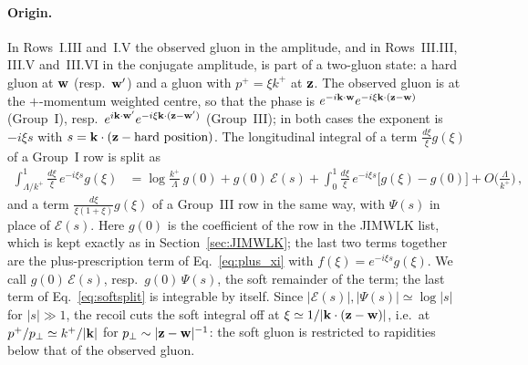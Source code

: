 \paragraph{Origin.} In Rows~I.III and~I.V the observed gluon in the amplitude, and in Rows~III.III, III.V and~III.VI in the conjugate amplitude, is part of a two-gluon state: a hard gluon at $\mathbf{w}$ (resp.\ $\mathbf{w}'$) and a gluon with $p^+=\xi k^+$ at $\mathbf{z}$. The observed gluon is at the $+$-momentum weighted centre, so that the phase is $e^{-i\mathbf{k}\cdot\mathbf{w}}e^{-i\xi\mathbf{k}\cdot(\mathbf{z}-\mathbf{w})}$ (Group~I), resp.\ $e^{i\mathbf{k}\cdot\mathbf{w}'}e^{-i\xi\mathbf{k}\cdot(\mathbf{z}-\mathbf{w}')}$ (Group~III); in both cases the exponent is $-i\xi s$ with $s=\mathbf{k}\cdot(\mathbf{z}-\text{hard position})$. The longitudinal integral of a term $\frac{d\xi}{\xi}g(\xi)$ of a Group~I row is split as
\begin{align}\label{eq:softsplit}
\int_{\Lambda/k^+}^{1}\frac{d\xi}{\xi}\,e^{-i\xi s}g(\xi)&=\log\frac{k^+}{\Lambda}\,g(0)+g(0)\,\mathcal E(s)+\int_0^{1}\frac{d\xi}{\xi}\,e^{-i\xi s}\big[g(\xi)-g(0)\big]+O\Big(\frac{\Lambda}{k^+}\Big)\,,
\end{align}
and a term $\frac{d\xi}{\xi(1+\xi)}g(\xi)$ of a Group~III row in the same way, with $\Psi(s)$ in place of $\mathcal E(s)$. Here $g(0)$ is the coefficient of the row in the JIMWLK list, which is kept exactly as in Section~\ref{sec:JIMWLK}; the last two terms together are the plus-prescription term of Eq.~\eqref{eq:plus_xi} with $f(\xi)=e^{-i\xi s}g(\xi)$. We call $g(0)\,\mathcal E(s)$, resp.\ $g(0)\,\Psi(s)$, the soft remainder of the term; the last term of Eq.~\eqref{eq:softsplit} is integrable by itself. Since $|\mathcal E(s)|,|\Psi(s)|\simeq\log|s|$ for $|s|\gg1$, the recoil cuts the soft integral off at $\xi\simeq1/|\mathbf{k}\cdot(\mathbf{z}-\mathbf{w})|$, i.e.\ at $p^+/p_\perp\simeq k^+/|\mathbf{k}|$ for $p_\perp\sim|\mathbf{z}-\mathbf{w}|^{-1}$: the soft gluon is restricted to rapidities below that of the observed gluon.

